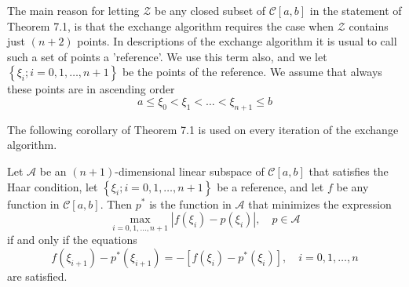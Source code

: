 \documentclass[11pt]{article}
\begin{document}
\begin{remark}
The main reason for letting $\mathscr{Z}$ be any closed subset of $\mathscr{C}[a, b]$ in the statement of Theorem 7.1, is that the exchange algorithm requires the case when $\mathscr{Z}$ contains just $(n+2)$ points. In descriptions of the exchange algorithm it is usual to call such a set of points a 'reference'. We use this term also, and we let $\left\{\xi_{i} ; i=0,1, \ldots, n+1\right\}$ be the points of the reference. We assume that always these points are in ascending order
\begin{equation*}
a \leqslant \xi_{0}<\xi_{1}<\ldots<\xi_{n+1} \leqslant b \tag{7.23}
\end{equation*}
\end{remark}



The following corollary of Theorem 7.1 is used on every iteration of the exchange algorithm.

\begin{theorem} \label{thm:4}
Let $\mathscr{A}$ be an $(n+1)$-dimensional linear subspace of $\mathscr{C}[a, b]$ that satisfies the Haar condition, let $\left\{\xi_{i} ; i=0,1, \ldots, n+1\right\}$ be a reference, and let $f$ be any function in $\mathscr{C}[a, b]$. Then $p^{*}$ is the function in $\mathscr{A}$ that minimizes the expression
\begin{equation}
\max _{i=0,1, \ldots, n+1}\left|f\left(\xi_{i}\right)-p\left(\xi_{i}\right)\right|, \quad p \in \mathscr{A} \label{eq:11}
\end{equation}
if and only if the equations
\begin{equation}
f\left(\xi_{i+1}\right)-p^{*}\left(\xi_{i+1}\right)=-\left[f\left(\xi_{i}\right)-p^{*}\left(\xi_{i}\right)\right], \quad i=0,1, \ldots, n \label{eq:12}
\end{equation}
are satisfied.
\end{theorem}
\end{document}
